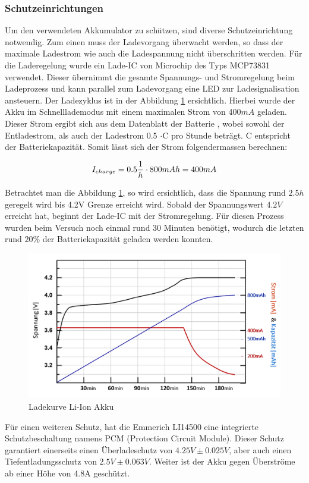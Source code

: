 \subsubsection*{Schutzeinrichtungen}\label{sec:schutzeinrichtung}
Um den verwendeten Akkumulator zu schützen, sind diverse Schutzeinrichtung notwendig. Zum einen muss der Ladevorgang überwacht werden, so dass der maximale Ladestrom wie auch die Ladespannung nicht überschritten werden. Für die Laderegelung wurde ein Lade-IC von Microchip des Typs MCP73831 verwendet. Dieser übernimmt die gesamte Spannungs- und Stromregelung beim Ladeprozess und kann parallel zum Ladevorgang eine LED zur Ladesignalisation ansteuern. Der Ladezyklus ist in der Abbildung  \ref{fig:Ladekurve Li-Ion Akku} ersichtlich. Hierbei wurde der Akku im Schnelllademodus mit einem maximalen Strom von $400mA$ geladen. Dieser Strom ergibt sich aus dem Datenblatt der Batterie \cite{LIBattery}, wobei sowohl der Entladestrom, als auch der Ladestrom 0.5 $\cdot$C pro Stunde beträgt. C entspricht der Batteriekapazität. Somit lässt sich der Strom folgendermassen berechnen:

\begin{equation}
\centering
I_{charge}={0.5 \dfrac{1}{h} \cdot 800mAh}= 400mA
\label{eq:Ladestrom}
\end{equation}

Betrachtet man die Abbildung \ref{fig:Ladekurve Li-Ion Akku}, so wird ersichtlich, dass die Spannung rund $2.5h$ geregelt wird bis 4.2V Grenze erreicht wird. Sobald der Spannungswert $4.2V$ erreicht hat, beginnt der Lade-IC mit der Stromregelung. Für diesen Prozess wurden beim Versuch noch einmal rund 30 Minuten benötigt, wodurch die letzten rund $20\%$ der Batteriekapazität geladen werden konnten.

\begin{figure}[H]
	\begin{center}
		\includegraphics[width=120mm]{data/LadekurveLiIon.png}
		\caption[Ladekurve Li-Ion Akku]{Ladekurve Li-Ion Akku} %
		\label{fig:Ladekurve Li-Ion Akku}
	\end{center}
\end{figure}


Für einen weiteren Schutz, hat die Emmerich LI14500 eine integrierte Schutzbeschaltung namens PCM (Protection Circuit Module). Dieser Schutz garantiert einerseits einen Überladeschutz von $4.25V\pm 0.025V$, aber auch einen Tiefentladungsschutz von $2.5V\pm 0.063V$. Weiter ist der Akku gegen Überströme ab einer Höhe von 4.8A geschützt.